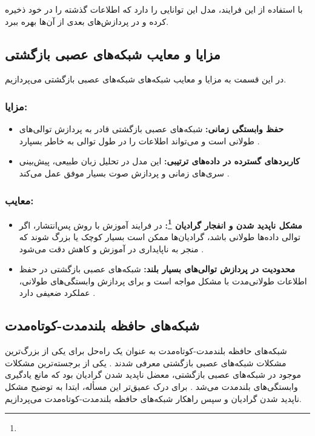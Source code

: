 با استفاده از این فرایند، مدل این توانایی را دارد که اطلاعات گذشته را در خود ذخیره کرده و در پردازش‌های بعدی از آن‌ها بهره ببرد.

\subsection{مزایا و معایب شبکه‌های عصبی بازگشتی}
در این قسمت به مزایا و معایب شبکه‌های شبکه‌های عصبی بازگشتی می‌پردازیم.

\subsubsection{مزایا:}
\begin{itemize}
	\item \textbf{حفظ وابستگی زمانی:}  
شبکه‌های عصبی بازگشتی قادر به پردازش توالی‌های طولانی است و می‌تواند اطلاعات را در طول توالی به خاطر بسپارد
	\cite{elman1990finding}.
	
	\item \textbf{کاربردهای گسترده در داده‌های ترتیبی:}  
	این مدل در تحلیل زبان طبیعی، پیش‌بینی سری‌های زمانی و پردازش صوت بسیار موفق عمل می‌کند
	\cite{gers1999learning}.
\end{itemize}

\subsubsection{معایب:}
\begin{itemize}
\item \textbf{مشکل ناپدید شدن و انفجار گرادیان \footnote{}:}
در فرایند آموزش با روش پس‌انتشار، اگر توالی داده‌ها طولانی باشد، گرادیان‌ها ممکن است بسیار کوچک یا بزرگ شوند که منجر به ناپایداری در آموزش و کاهش دقت می‌شود
	\cite{hochreiter1998vanishing}.
	
	\item \textbf{محدودیت در پردازش توالی‌های بسیار بلند:}  
 شبکه‌های عصبی بازگشتی در حفظ اطلاعات طولانی‌مدت با مشکل مواجه است و برای پردازش وابستگی‌های طولانی، عملکرد ضعیفی دارد
	\cite{hochreiter1997long,goodfellow2016deep}.
\end{itemize}

\subsection{شبکه‌های حافظه بلندمدت-کوتاه‌مدت}

شبکه‌های حافظه بلندمدت-کوتاه‌مدت به عنوان یک راه‌حل برای یکی از بزرگ‌ترین مشکلات شبکه‌های عصبی بازگشتی معرفی شدند
\cite{hochreiter1997long}.
یکی از برجسته‌ترین مشکلات موجود در شبکه‌های عصبی بازگشتی، معضل ناپدید شدن گرادیان  بود که مانع یادگیری وابستگی‌های بلندمدت می‌شد
\cite{hochreiter1998vanishing,goodfellow2016deep}.
برای درک عمیق‌تر این مسأله، ابتدا به توضیح مشکل ناپدید شدن گرادیان و سپس راهکار شبکه‌های حافظه بلندمدت-کوتاه‌مدت می‌پردازیم.

